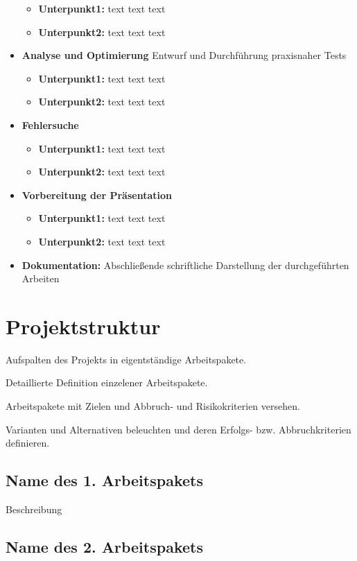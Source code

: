 \documentclass[lang=ngerman,inputenc=utf8,fontsize=10pt]{ldvarticle}
\begin{document}
\begin{itemize}
\begin{itemize}
			\item \textbf{Unterpunkt1:} text text text
			\item \textbf{Unterpunkt2:} text text text 
		\end{itemize}
	\item \textbf{Analyse und Optimierung} Entwurf und Durchführung praxisnaher Tests
		\begin{itemize}
			\item \textbf{Unterpunkt1:} text text text
			\item \textbf{Unterpunkt2:} text text text
		\end{itemize}
	\item \textbf{Fehlersuche}  
		\begin{itemize}
			\item \textbf{Unterpunkt1:} text text text
			\item \textbf{Unterpunkt2:} text text text
		\end{itemize}
	\item \textbf{Vorbereitung der Präsentation}  
		\begin{itemize}
			\item \textbf{Unterpunkt1:} text text text
			\item \textbf{Unterpunkt2:} text text text
		\end{itemize}
	\item \textbf{Dokumentation:} Abschließende schriftliche Darstellung der durchgeführten Arbeiten
\end{itemize}

\section{Projektstruktur}

Aufspalten des Projekts in eigentständige Arbeitspakete.

Detaillierte Definition einzelener Arbeitspakete.

Arbeitspakete mit Zielen und Abbruch- und Risikokriterien versehen.

Varianten und Alternativen beleuchten und deren Erfolgs- bzw. Abbruchkriterien definieren.

\subsection*{Name des 1. Arbeitspakets}

Beschreibung

\subsection*{Name des 2. Arbeitspakets}
\end{document}
